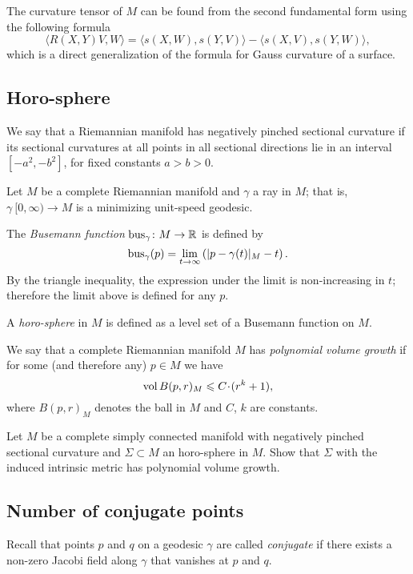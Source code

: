 The curvature tensor of $M$ can be found from the second fundamental form using the following  formula
\[\langle R(X,Y)V,W\rangle=\langle s(X,W),s(Y,V)\rangle-\langle s(X,V),s(Y,W)\rangle,\]
which is a direct generalization of the formula for Gauss curvature of a surface.


\subsection*{Horo-sphere}
\label{Horosphere}

We say that a Riemannian manifold has negatively pinched sectional curvature if its sectional curvatures at all points in all sectional directions lie in an interval $[-a^2, -b^2]$, for fixed constants $a>b>0$.

Let $M$ be a complete Riemannian manifold
and $\gamma$ a ray in $M$; 
that is, $\gamma\:[0, \infty)\to M$ is a minimizing unit-speed geodesic.

The \label{page:Busemann function}\emph{Busemann function} $\operatorname{\rm bus}\nolimits_\gamma\colon M\to\mathbb{R}$ is defined by
$$\operatorname{\rm bus}\nolimits_\gamma(p)=\lim_{t\to\infty}\left(|p-\gamma(t)|_M-t\right).$$
By the triangle inequality, 
the expression under the limit is non-increasing in $t$; 
therefore  the limit above is defined for any $p$.

A \emph{horo-sphere} in $M$ is defined as a level set of a Busemann function
on $M$.

We say that a complete Riemannian manifold $M$ has \emph{polynomial volume growth} if for some (and therefore any) $p\in M$ we have 
$$\vol B(p,r)_M\z\le C\cdot (r^k+1),$$ 
where $B(p,r)_M$ denotes the ball in $M$ and  $C$, $k$ are constants.

\begin{pr} Let $M$ be a complete simply connected manifold with negatively pinched sectional curvature
and $\Sigma\subset M$ an horo-sphere in $M$.
Show that
$\Sigma$ with the induced intrinsic metric 
has polynomial volume growth.
\end{pr}

\subsection*{Number of conjugate points}
\label{Number of conjugate points}

Recall that points $p$ and $q$ on a geodesic $\gamma$ are called \emph{conjugate} if there exists a non-zero Jacobi field along $\gamma$ that vanishes at $p$ and $q$. 


